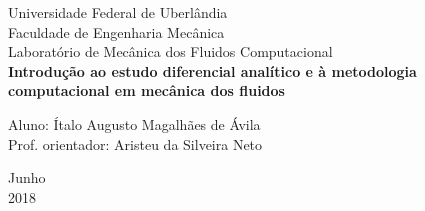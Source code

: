 \begin{titlepage}
	\begin{center}
	

		\Huge{Universidade Federal de Uberlândia}\\
		\large{Faculdade de Engenharia Mecânica}\\ 
		\large{Laboratório de Mecânica dos Fluidos Computacional}\\ 
		\vspace{15pt}
        \vspace{95pt}
        \textbf{\LARGE{Introdução ao estudo diferencial analítico e à metodologia computacional em
mecânica dos fluidos}}\\
		\vspace{7,5cm}
	\end{center}
	
	\begin{flushleft}
		\begin{tabbing}
			Aluno: Ítalo Augusto Magalhães de Ávila \\
			Prof. orientador: Aristeu da Silveira Neto \\
	    \end{tabbing}
    \end{flushleft}
	\vspace{1cm}
	
	\begin{center}
		\vspace{\fill}
			 Junho\\
		 2018
			\end{center}
\end{titlepage}

